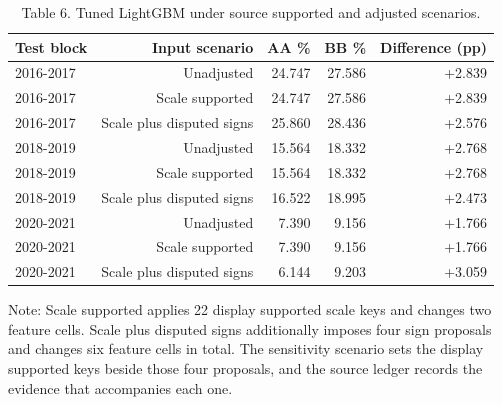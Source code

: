 \documentclass[10pt,a4paper,twocolumn]{article}
\begin{document}
\begin{table}[tbp]
\centering
\footnotesize
\caption{Table 6. Tuned LightGBM under source supported and adjusted scenarios.}
\label{main-tab-5}
\begin{tabular}{lrrrr}
\toprule
Test block & Input scenario & AA \% & BB \% & Difference (pp) \\
\midrule
2016-2017 & Unadjusted & 24.747 & 27.586 & +2.839 \\
2016-2017 & Scale supported & 24.747 & 27.586 & +2.839 \\
2016-2017 & Scale plus disputed signs & 25.860 & 28.436 & +2.576 \\
2018-2019 & Unadjusted & 15.564 & 18.332 & +2.768 \\
2018-2019 & Scale supported & 15.564 & 18.332 & +2.768 \\
2018-2019 & Scale plus disputed signs & 16.522 & 18.995 & +2.473 \\
2020-2021 & Unadjusted & 7.390 & 9.156 & +1.766 \\
2020-2021 & Scale supported & 7.390 & 9.156 & +1.766 \\
2020-2021 & Scale plus disputed signs & 6.144 & 9.203 & +3.059 \\
\bottomrule
\end{tabular}
\end{table}

Note: Scale supported applies 22 display supported scale keys and changes two feature cells. Scale plus disputed signs additionally imposes four sign proposals and changes six feature cells in total. The sensitivity scenario sets the display supported keys beside those four proposals, and the source ledger records the evidence that accompanies each one.

\par\vspace{4pt}\par\vspace{4pt}
\end{document}
